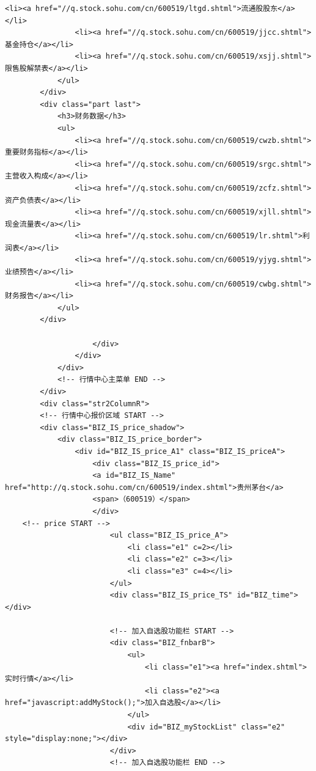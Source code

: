 \documentclass[UTF8,12pt]{article}
\begin{document}
\begin{lstlisting}[title=股票代码300117的界面html源码,frame=shadowbox]
                <li><a href="//q.stock.sohu.com/cn/600519/ltgd.shtml">流通股股东</a></li>
                <li><a href="//q.stock.sohu.com/cn/600519/jjcc.shtml">基金持仓</a></li>
                <li><a href="//q.stock.sohu.com/cn/600519/xsjj.shtml">限售股解禁表</a></li>
            </ul>
        </div>
        <div class="part last">
            <h3>财务数据</h3>
            <ul>
                <li><a href="//q.stock.sohu.com/cn/600519/cwzb.shtml">重要财务指标</a></li>
                <li><a href="//q.stock.sohu.com/cn/600519/srgc.shtml">主营收入构成</a></li>
                <li><a href="//q.stock.sohu.com/cn/600519/zcfz.shtml">资产负债表</a></li>
                <li><a href="//q.stock.sohu.com/cn/600519/xjll.shtml">现金流量表</a></li>
                <li><a href="//q.stock.sohu.com/cn/600519/lr.shtml">利润表</a></li>
                <li><a href="//q.stock.sohu.com/cn/600519/yjyg.shtml">业绩预告</a></li>
                <li><a href="//q.stock.sohu.com/cn/600519/cwbg.shtml">财务报告</a></li>
            </ul>
        </div>
    
                    </div>
                </div>
            </div>
            <!-- 行情中心主菜单 END -->
        </div>
        <div class="str2ColumnR">
        <!-- 行情中心报价区域 START -->
        <div class="BIZ_IS_price_shadow">
            <div class="BIZ_IS_price_border">
                <div id="BIZ_IS_price_A1" class="BIZ_IS_priceA">
                    <div class="BIZ_IS_price_id">
                    <a id="BIZ_IS_Name" href="http://q.stock.sohu.com/cn/600519/index.shtml">贵州茅台</a>
                    <span>（600519）</span>
                    </div>
    <!-- price START -->
                        <ul class="BIZ_IS_price_A">
                            <li class="e1" c=2></li>
                            <li class="e2" c=3></li>
                            <li class="e3" c=4></li>
                        </ul>
                        <div class="BIZ_IS_price_TS" id="BIZ_time"></div>
    
                        <!-- 加入自选股功能栏 START -->
                        <div class="BIZ_fnbarB">
                            <ul>
                                <li class="e1"><a href="index.shtml">实时行情</a></li>
                                <li class="e2"><a href="javascript:addMyStock();">加入自选股</a></li>
                            </ul>
                            <div id="BIZ_myStockList" class="e2" style="display:none;"></div>
                        </div>
                        <!-- 加入自选股功能栏 END -->
    

\end{lstlisting}
\end{document}
